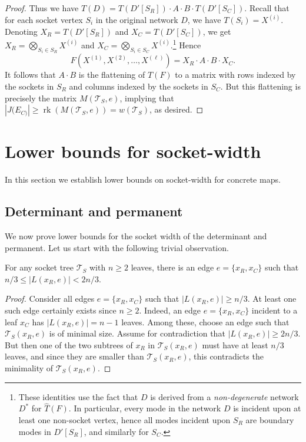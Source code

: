 \documentclass{toc}
\newcommand{\rk}{\ensuremath{\operatorname{rk}}}
\newcommand{\ts}{\ensuremath{\mathcal{T}_S}}
\begin{document}
\begin{proof}
  Thus we have $T(D) = T(D'[S_R]) \cdot A \cdot
  B \cdot T(D'[S_C])$.  Recall that for each
  socket vertex $S_i$ in the original network $D$, we have $T(S_i) = X^{(i)}$.  Denoting $X_R = T(D'[S_R])$ and $X_C = T(D'[S_C])$, we get $X_R = \bigotimes_{S_i \in S_R} X^{(i)}$ and $X_C = \bigotimes_{S_i \in S_C} X^{(i)}$.\footnote{These identities use the fact that $D$ is derived from a \emph{non-degenerate} network $D^*$ for $\hat{T}(F)$.  In particular, every mode in the network $D$ is incident upon at least one non-socket vertex, hence all modes incident upon $S_R$ are boundary modes in $D'[S_R]$, and similarly for $S_C$.}
    Hence
  \[
  F(X^{(1)}, X^{(2)}, \ldots, X^{(\ell)}) = X_R \cdot A \cdot B \cdot X_C.
  \]
  It follows that $A \cdot B$ is the flattening of $T(F)$
  to a matrix with rows indexed by the sockets in $S_R$ and columns
  indexed by the sockets in $S_C$.  But this flattening is precisely
  the matrix $M(\ts, e)$, implying that $|J(E_{C)}| \ge \rk(M(\ts, e)) =
  w(\ts)$, as desired.
\end{proof}


\section{Lower bounds for socket-width}
\label{sec:socket-width lower bound}

In this section we establish lower bounds on socket-width for concrete
maps.

\subsection{Determinant and permanent}
\label{sec:det and per socket width lower bounds}
\label{sec:permanent barrier}

We now prove lower bounds for the socket width of the determinant and
permanent.
Let us start with the following trivial observation.

\begin{claim}
  \label{claim:balanced edge}
  For any socket tree $\ts$ with $n \ge 2$ leaves, there is an edge $e = \{x_R, x_C\}$
  such that $n/3 \le |L(x_R, e)| < 2n/3$.
\end{claim}

\begin{proof}
  Consider all edges $e = \{x_R, x_C\}$ such that $|L(x_R, e)| \ge n/3$.  At
  least one such edge certainly exists since $n \ge 2$. Indeed, an edge
  $e = \{x_R, x_C\}$ incident to a leaf $x_C$ has $|L(x_R, e)| = n-1$
  leaves.  Among these, choose an edge such that $\ts(x_R, e)$ is of minimal size.
%
  Assume for contradiction that $|L(x_R, e)| \ge 2n/3$.  But then one of
  the two subtrees of $x_R$ in $\ts(x_R, e)$ must have at least $n/3$
  leaves, and since they are smaller than $\ts(x_R, e)$, this contradicts
  the minimality of $\ts(x_R, e)$.
\end{proof}
\end{document}
